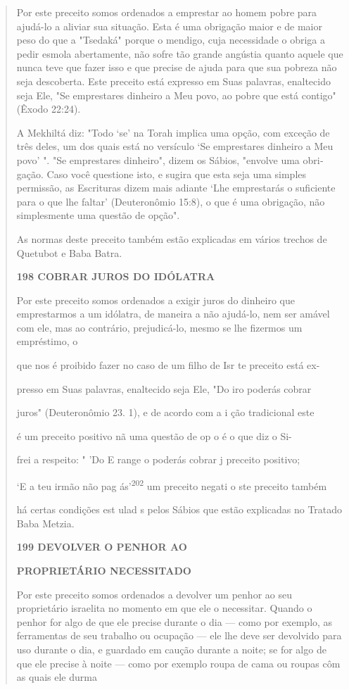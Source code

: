 \begin{quote}
Por este preceito somos ordenados a emprestar ao homem pobre para
ajudá-lo a aliviar sua situação. Esta é uma obrigação maior e de maior
peso do que a "Tsedaká" porque o mendigo, cuja necessidade o obriga a
pedir es­mola abertamente, não sofre tão grande angústia quanto aquele
que nunca teve que fazer isso e que precise de ajuda para que sua
pobreza não seja descoberta. Este preceito está expresso em Suas
palavras, enaltecido seja Ele, "Se empresta­res dinheiro a Meu povo, ao
pobre que está contigo" (Êxodo 22:24).

A Mekhiltá diz: "Todo `se' na Torah implica uma opção, com exce­ção de
três deles, um dos quais está no versículo `Se emprestares dinheiro a
Meu povo' ". "Se emprestares dinheiro", dizem os Sábios, "envolve uma
obri­gação. Caso você questione isto, e sugira que esta seja uma simples
permissão, as Escrituras dizem mais adiante `Lhe emprestarás o
suficiente para o que lhe faltar' (Deuteronômio 15:8), o que é uma
obrigação, não simplesmente uma ques­tão de opção".

As normas deste preceito também estão explicadas em vários trechos de
Quetubot e Baba Batra.

\textbf{198 COBRAR JUROS DO IDÓLATRA}

Por este preceito somos ordenados a exigir juros do dinheiro que
emprestarmos a um idólatra, de maneira a não ajudá-lo, nem ser amável
com ele, mas ao contrário, prejudicá-lo, mesmo se lhe fizermos um
empréstimo, o

que nos é proibido fazer no caso de um filho de Isr te preceito está ex-

presso em Suas palavras, enaltecido seja Ele, "Do iro poderás cobrar

juros" (Deuteronômio 23. 1), e de acordo com a i ção tradicional este

é um preceito positivo nã uma questão de op o é o que diz o Si-

frei a respeito: " 'Do E range o poderás cobrar j preceito positivo;

`E a teu irmão não pag ás'\textsuperscript{202} um preceito negati o ste
preceito também

há certas condições est ulad s pelos Sábios que estão explicadas no
Tratado Baba Metzia.

\textbf{199 DEVOLVER O PENHOR AO}

\textbf{PROPRIETÁRIO NECESSITADO}

Por este preceito somos ordenados a devolver um penhor ao seu
proprietário israelita no momento em que ele o necessitar. Quando o
penhor for algo de que ele precise durante o dia --- como por exemplo,
as ferramentas de seu trabalho ou ocupação --- ele lhe deve ser
devolvido para uso durante o dia, e guardado em caução durante a noite;
se for algo de que ele precise à noite --- como por exemplo roupa de
cama ou roupas côm as quais ele durma
\end{quote}


